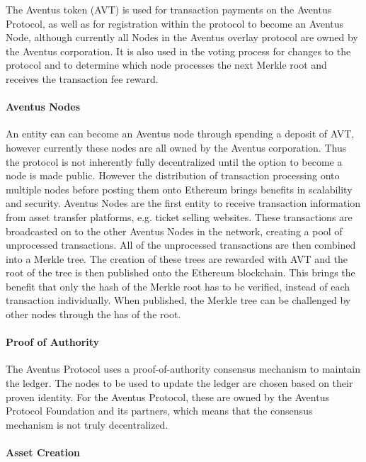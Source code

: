 The Aventus token (AVT) is used for transaction payments on the Aventus Protocol, as well as for registration within the protocol to become an Aventus Node, although currently all Nodes in the Aventus overlay protocol are owned by the Aventus corporation. It is also used in the voting process for changes to the protocol and to determine which node processes the next Merkle root and receives the transaction fee reward.

\paragraph{Aventus Nodes}\label{subsection:aventus nodes}

 An entity can can become an Aventus node through spending a deposit of AVT, however currently these nodes are all owned by the Aventus corporation. Thus the protocol is not inherently fully decentralized until the option to become a node is made public. However the distribution of transaction processing onto multiple nodes before posting them onto Ethereum brings benefits in scalability and security.
 Aventus Nodes are the first entity to receive transaction information from asset transfer platforms, e.g. ticket selling websites. These transactions are broadcasted on to the other Aventus Nodes in the network, creating a pool of unprocessed transactions. All of the unprocessed transactions are then combined into a Merkle tree. The creation of these trees are rewarded with AVT and the root of the tree is then published onto the Ethereum blockchain. This brings the benefit that only the hash of the Merkle root has to be verified, instead of each transaction individually. When published, the Merkle tree can be challenged by other nodes through the has of the root.

\paragraph{Proof of Authority}

The Aventus Protocol uses a proof-of-authority consensus mechanism to maintain the ledger. The nodes to be used to update the ledger are chosen based on their proven identity. For the Aventus Protocol, these are owned by the Aventus Protocol Foundation and its partners, which means that the consensus mechanism is not truly decentralized. 

\paragraph{Asset Creation}

